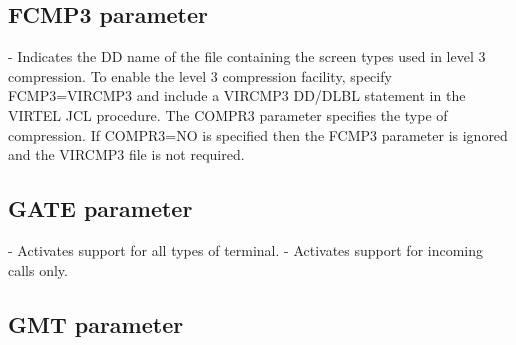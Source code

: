 \documentclass[letterpaper,10pt,english]{sphinxmanual}
\begin{document}
\ignorespaces 

\subsection{FCMP3 parameter}
\label{\detokenize{Installation_Guide:fcmp3-parameter}}\label{\detokenize{Installation_Guide:index-66}}
\begin{sphinxVerbatim}[commandchars=\\\{\}]
 
\end{sphinxVerbatim}

 - Indicates the DD name of the file containing the screen types used in level 3 compression. To enable the level 3 compression facility, specify FCMP3=VIRCMP3 and include a VIRCMP3 DD/DLBL statement in the VIRTEL JCL procedure. The COMPR3 parameter specifies the type of compression. If COMPR3=NO is specified then the FCMP3 parameter is ignored and the VIRCMP3 file is not required.

\ignorespaces 

\subsection{GATE parameter}
\label{\detokenize{Installation_Guide:gate-parameter}}\label{\detokenize{Installation_Guide:index-67}}
\begin{sphinxVerbatim}[commandchars=\\\{\}]
 
\end{sphinxVerbatim}

 - Activates support for all types of terminal.
 - Activates support for incoming calls only.

\ignorespaces 

\subsection{GMT parameter}
\label{\detokenize{Installation_Guide:gmt-parameter}}\label{\detokenize{Installation_Guide:index-68}}
\begin{sphinxVerbatim}[commandchars=\\\{\}]
 
\end{sphinxVerbatim}
\end{document}
